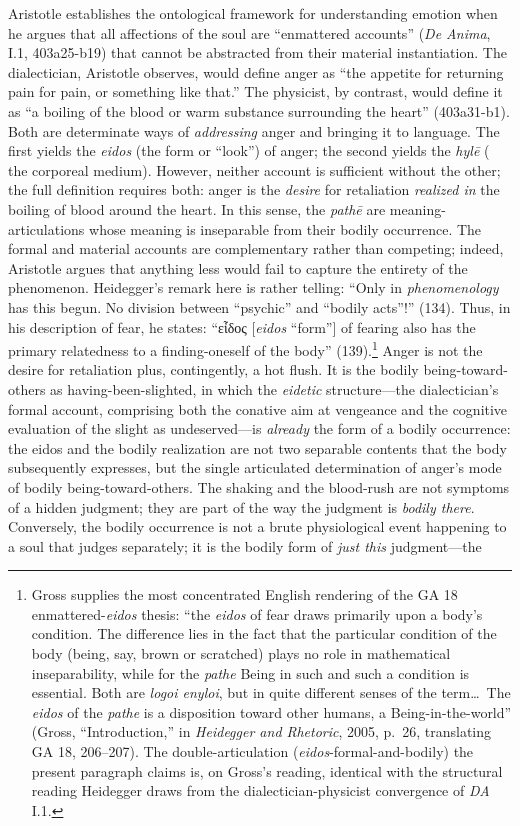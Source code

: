 \documentclass{article}
\newcommand{\gk}[1]{{\greekfont #1}}
\begin{document}
Aristotle establishes the ontological framework for understanding emotion when he argues that all affections of the soul are ``enmattered accounts'' (\textit{De Anima}, I.1, 403a25-b19) that cannot be abstracted from their material instantiation. The dialectician, Aristotle observes, would define anger as ``the appetite for returning pain for pain, or something like that.'' The physicist, by contrast, would define it as ``a boiling of the blood or warm substance surrounding the heart'' (403a31-b1). Both are determinate ways of \textit{addressing} anger and bringing it to language. The first yields the \textit{eidos} (the form or ``look'') of anger; the second yields the \textit{hylē} ( the corporeal medium). However, neither account is sufficient without the other; the full definition requires both: anger is the \textit{desire} for retaliation \textit{realized in} the boiling of blood around the heart. In this sense, the \textit{pathē} are meaning-articulations whose meaning is inseparable from their bodily occurrence. The formal and material accounts are complementary rather than competing; indeed, Aristotle argues that anything less would fail to capture the entirety of the phenomenon. Heidegger's remark here is rather telling: ``Only in \textit{phenomenology} has this begun. No division between ``psychic'' and ``bodily acts''!'' (134). Thus, in his description of fear, he states: ``\gk{εἶδος} [\textit{eidos} ``form''] of fearing also has the primary relatedness to a finding-oneself of the body'' (139).\footnote{Gross supplies the most concentrated English rendering of the GA 18 enmattered-\textit{eidos} thesis: ``the \textit{eidos} of fear draws primarily upon a body's condition. The difference lies in the fact that the particular condition of the body (being, say, brown or scratched) plays no role in mathematical inseparability, while for the \textit{pathe} Being in such and such a condition is essential. Both are \textit{logoi enyloi}, but in quite different senses of the term\ldots\ The \textit{eidos} of the \textit{pathe} is a disposition toward other humans, a Being-in-the-world'' (Gross, ``Introduction,'' in \textit{Heidegger and Rhetoric}, 2005, p.~26, translating GA 18, 206--207). The double-articulation (\textit{eidos}-formal-and-bodily) the present paragraph claims is, on Gross's reading, identical with the structural reading Heidegger draws from the dialectician-physicist convergence of \textit{DA} I.1.} Anger is not the desire for retaliation plus, contingently, a hot flush. It is the bodily being-toward-others as having-been-slighted, in which the \textit{eidetic} structure---the dialectician's formal account, comprising both the conative aim at vengeance and the cognitive evaluation of the slight as undeserved---is \textit{already} the form of a bodily occurrence: the eidos and the bodily realization are not two separable contents that the body subsequently expresses, but the single articulated determination of anger's mode of bodily being-toward-others. The shaking and the blood-rush are not symptoms of a hidden judgment; they are part of the way the judgment is \textit{bodily there}. Conversely, the bodily occurrence is not a brute physiological event happening to a soul that judges separately; it is the bodily form of \textit{just this} judgment---the 
\end{document}
